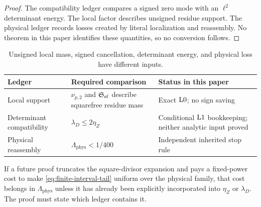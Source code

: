 \begin{proof}
The compatibility ledger compares a signed zero mode with an
\(\ell^2\) determinant energy.  The local factor describes unsigned
residue support.  The physical ledger records losses created by
literal localization and reassembly.  No theorem in this paper
identifies these quantities, so no conversion follows.
\end{proof}

\begin{table}[ht]
\centering
\small
\begin{tabularx}{\textwidth}{@{}
  >{\raggedright\arraybackslash}p{}
  >{\raggedright\arraybackslash}X
  >{\raggedright\arraybackslash}p{}@{}}
\toprule
Ledger & Required comparison & Status in this paper\\
\midrule
Local support
&
\(\nu_{p,2}\) and \(\mathfrak S_{\mathrm{sf}}\) describe squarefree residue mass
&
Exact \(\mathrm{L0}\); no sign saving
\\
\addlinespace
Determinant compatibility
&
\(\lambda_D\le2\eta_Z\)
&
Conditional \(\mathrm{L1}\) bookkeeping; neither analytic input proved
\\
\addlinespace
Physical reassembly
&
\(\Lambda_{\mathrm{phys}}<1/400\)
&
Independent inherited stop rule
\\
\bottomrule
\end{tabularx}
\caption{Unsigned local mass, signed cancellation, determinant
energy, and physical loss have different inputs.}
\label{tab:independent-ledgers}
\end{table}

\begin{remark}
If a future proof truncates the square-divisor expansion and pays a
fixed-power cost to make \eqref{eq:finite-interval-tail} uniform over
the physical family, that cost belongs in
\(\Lambda_{\mathrm{phys}}\) unless it has already been explicitly
incorporated into \(\eta_Z\) or \(\lambda_D\).  The proof must state
which ledger contains it.
\end{remark}
